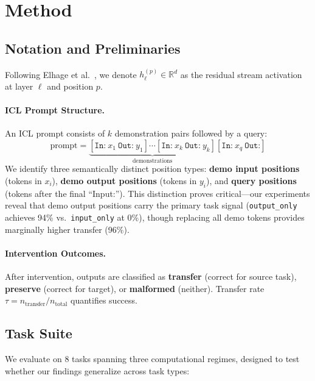 \documentclass[runningheads]{llncs}
\begin{document}
\section{Method}
\label{sec:method}

\subsection{Notation and Preliminaries}

Following Elhage et al.~\cite{elhage2021mathematical}, we denote $h_\ell^{(p)} \in \mathbb{R}^d$ as the residual stream activation at layer $\ell$ and position $p$.

\paragraph{ICL Prompt Structure.} An ICL prompt consists of $k$ demonstration pairs followed by a query:
\begin{equation}
    \text{prompt} = \underbrace{[\texttt{In:}~x_1~\texttt{Out:}~y_1] \cdots [\texttt{In:}~x_k~\texttt{Out:}~y_k]}_{\text{demonstrations}} [\texttt{In:}~x_q~\texttt{Out:}]
\end{equation}
We identify three semantically distinct position types: \textbf{demo input positions} (tokens in $x_i$), \textbf{demo output positions} (tokens in $y_i$), and \textbf{query positions} (tokens after the final ``Input:''). This distinction proves critical---our experiments reveal that demo output positions carry the primary task signal (\texttt{output\_only} achieves 94\% vs.\ \texttt{input\_only} at 0\%), though replacing all demo tokens provides marginally higher transfer (96\%).

\paragraph{Intervention Outcomes.} After intervention, outputs are classified as \textbf{transfer} (correct for source task), \textbf{preserve} (correct for target), or \textbf{malformed} (neither). Transfer rate $\tau = n_{\text{transfer}} / n_{\text{total}}$ quantifies success.

\subsection{Task Suite}

We evaluate on 8 tasks spanning three computational regimes, designed to test whether our findings generalize across task types:
\end{document}
